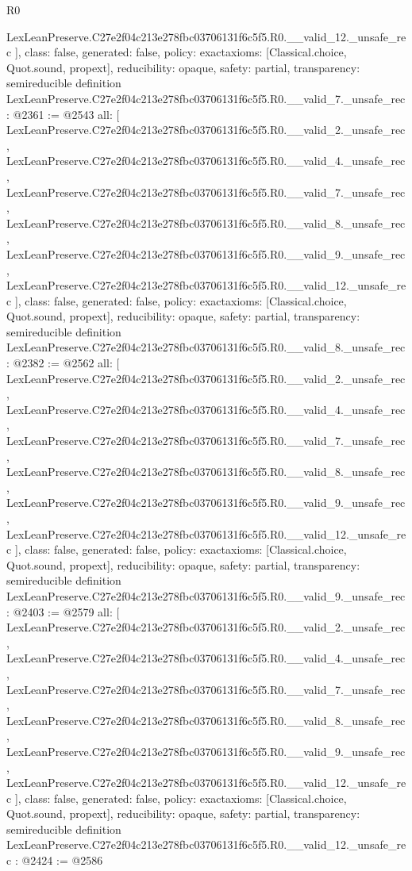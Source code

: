 \begin{lexlean}{R0}
\begin{coremodule}
{    LexLeanPreserve.C27e2f04c213e278fbc03706131f6c5f5.R0.__valid_12._unsafe_rec
  ],
  class: false,
  generated: false,
  policy: exact{axioms: [Classical.choice, Quot.sound, propext]},
  reducibility: opaque{},
  safety: partial,
  transparency: semireducible
}
definition LexLeanPreserve.C27e2f04c213e278fbc03706131f6c5f5.R0.__valid_7._unsafe_rec : @2361 := @2543 {
  all: [
    LexLeanPreserve.C27e2f04c213e278fbc03706131f6c5f5.R0.__valid_2._unsafe_rec,
    LexLeanPreserve.C27e2f04c213e278fbc03706131f6c5f5.R0.__valid_4._unsafe_rec,
    LexLeanPreserve.C27e2f04c213e278fbc03706131f6c5f5.R0.__valid_7._unsafe_rec,
    LexLeanPreserve.C27e2f04c213e278fbc03706131f6c5f5.R0.__valid_8._unsafe_rec,
    LexLeanPreserve.C27e2f04c213e278fbc03706131f6c5f5.R0.__valid_9._unsafe_rec,
    LexLeanPreserve.C27e2f04c213e278fbc03706131f6c5f5.R0.__valid_12._unsafe_rec
  ],
  class: false,
  generated: false,
  policy: exact{axioms: [Classical.choice, Quot.sound, propext]},
  reducibility: opaque{},
  safety: partial,
  transparency: semireducible
}
definition LexLeanPreserve.C27e2f04c213e278fbc03706131f6c5f5.R0.__valid_8._unsafe_rec : @2382 := @2562 {
  all: [
    LexLeanPreserve.C27e2f04c213e278fbc03706131f6c5f5.R0.__valid_2._unsafe_rec,
    LexLeanPreserve.C27e2f04c213e278fbc03706131f6c5f5.R0.__valid_4._unsafe_rec,
    LexLeanPreserve.C27e2f04c213e278fbc03706131f6c5f5.R0.__valid_7._unsafe_rec,
    LexLeanPreserve.C27e2f04c213e278fbc03706131f6c5f5.R0.__valid_8._unsafe_rec,
    LexLeanPreserve.C27e2f04c213e278fbc03706131f6c5f5.R0.__valid_9._unsafe_rec,
    LexLeanPreserve.C27e2f04c213e278fbc03706131f6c5f5.R0.__valid_12._unsafe_rec
  ],
  class: false,
  generated: false,
  policy: exact{axioms: [Classical.choice, Quot.sound, propext]},
  reducibility: opaque{},
  safety: partial,
  transparency: semireducible
}
definition LexLeanPreserve.C27e2f04c213e278fbc03706131f6c5f5.R0.__valid_9._unsafe_rec : @2403 := @2579 {
  all: [
    LexLeanPreserve.C27e2f04c213e278fbc03706131f6c5f5.R0.__valid_2._unsafe_rec,
    LexLeanPreserve.C27e2f04c213e278fbc03706131f6c5f5.R0.__valid_4._unsafe_rec,
    LexLeanPreserve.C27e2f04c213e278fbc03706131f6c5f5.R0.__valid_7._unsafe_rec,
    LexLeanPreserve.C27e2f04c213e278fbc03706131f6c5f5.R0.__valid_8._unsafe_rec,
    LexLeanPreserve.C27e2f04c213e278fbc03706131f6c5f5.R0.__valid_9._unsafe_rec,
    LexLeanPreserve.C27e2f04c213e278fbc03706131f6c5f5.R0.__valid_12._unsafe_rec
  ],
  class: false,
  generated: false,
  policy: exact{axioms: [Classical.choice, Quot.sound, propext]},
  reducibility: opaque{},
  safety: partial,
  transparency: semireducible
}
definition LexLeanPreserve.C27e2f04c213e278fbc03706131f6c5f5.R0.__valid_12._unsafe_rec : @2424 := @2586 {
}
\end{coremodule}
\end{lexlean}
